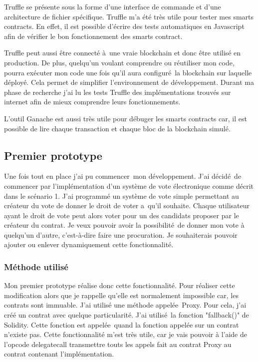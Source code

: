 Truffle se présente sous la forme d'une interface de commande et d'une architecture de fichier spécifique. Truffle m'a été très
utile pour tester mes smarts contracts. En effet, il est possible d'écrire des tests automatiques en Javascript afin
de vérifier le bon fonctionnement des smarts contract.

Truffle peut aussi être connecté à une vraie blockchain et donc être utilisé en production. De plus, quelqu'un voulant comprendre
ou réutiliser mon code, pourra exécuter mon code une fois qu'il aura configuré la blockchain sur laquelle déployé. Cela permet 
de simplifier l'environnement de développement. Durant ma phase
de recherche j'ai lu les tests Truffle des implémentations trouvés sur internet afin de mieux comprendre leurs fonctionnements.

L'outil Ganache est aussi très utile pour débuger les smarts contracts car, il est possible de lire chaque transaction et chaque
bloc de la blockchain simulé.

\subsection{Premier prototype}

Une fois tout en place j'ai pu commencer mon développement. J'ai décidé de commencer par l'implémentation d'un système de vote 
électronique comme décrit dans le scénario 1. J'ai programmé un système de vote simple permettant au créateur du vote de donner
le droit de voter a qu'il souhaite. Chaque utilisateur ayant le droit de vote peut alors voter pour un des candidats proposer par
le créateur du contrat. Je veux pouvoir avoir la possibilité de donner mon vote à quelqu'un d'autre, c'est-à-dire faire une 
procuration. Je souhaiterais pouvoir ajouter ou enlever dynamiquement cette fonctionnalité.

\subsubsection{Méthode utilisé}

Mon premier prototype réalise donc cette fonctionnalité. Pour réaliser cette modification alors que je rappelle 
qu'elle est normalement impossible car, les contrats sont immuable. J'ai utilisé une méthode appelée Proxy.
Pour cela, j'ai créé un contrat avec quelque particularité. J'ai utilisé la fonction "fallback()" de Solidity.
Cette fonction est appelée quand la fonction appelée sur un contrat n'existe pas. Cette fonctionnalité m'est très
utile, car je vais pouvoir à l'aide de l'opcode delegatecall transmettre touts les appels fait au contrat Proxy
au contrat contenant l'implémentation.

